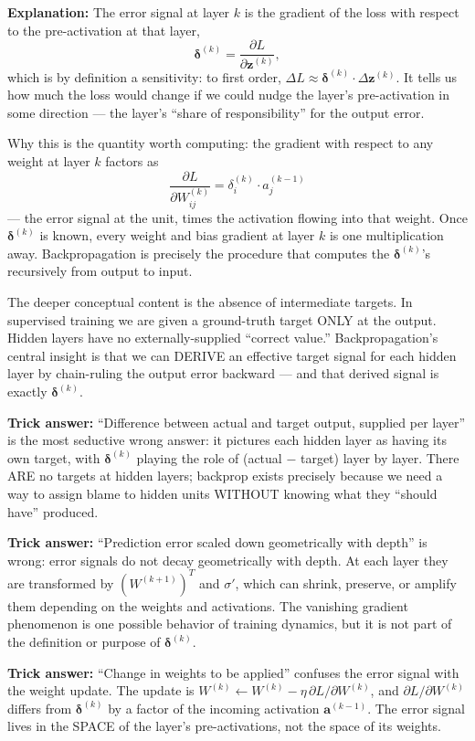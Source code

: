 \documentclass[12pt]{amsart}
\begin{document}
\textbf{Explanation:}
The error signal at layer $k$ is the gradient of the loss with respect to the
pre-activation at that layer,
$$\boldsymbol{\delta}^{(k)} = \frac{\partial L}{\partial \mathbf{z}^{(k)}},$$
which is by definition a sensitivity: to first order,
$\Delta L \approx \boldsymbol{\delta}^{(k)} \cdot \Delta \mathbf{z}^{(k)}$.
It tells us how much the loss would change if we could nudge the layer's
pre-activation in some direction --- the layer's ``share of responsibility''
for the output error.

Why this is the quantity worth computing: the gradient with respect to any
weight at layer $k$ factors as
$$\frac{\partial L}{\partial W_{ij}^{(k)}} = \delta_i^{(k)} \cdot a_j^{(k-1)}$$
--- the error signal at the unit, times the activation flowing into that
weight. Once $\boldsymbol{\delta}^{(k)}$ is known, every weight and bias
gradient at layer $k$ is one multiplication away. Backpropagation is precisely
the procedure that computes the $\boldsymbol{\delta}^{(k)}$'s recursively from
output to input.

The deeper conceptual content is the absence of intermediate targets.
In supervised training we are given a ground-truth target ONLY at the output.
Hidden layers have no externally-supplied ``correct value.'' Backpropagation's
central insight is that we can DERIVE an effective target signal for each
hidden layer by chain-ruling the output error backward --- and that derived
signal is exactly $\boldsymbol{\delta}^{(k)}$.

\textbf{Trick answer:}
``Difference between actual and target output, supplied per layer'' is the
most seductive wrong answer: it pictures each hidden layer as having its own
target, with $\boldsymbol{\delta}^{(k)}$ playing the role of (actual $-$ target)
layer by layer. There ARE no targets at hidden layers; backprop exists
precisely because we need a way to assign blame to hidden units WITHOUT
knowing what they ``should have'' produced.

\textbf{Trick answer:}
``Prediction error scaled down geometrically with depth'' is wrong: error
signals do not decay geometrically with depth. At each layer they are
transformed by $(W^{(k+1)})^T$ and $\sigma'$, which can shrink, preserve,
or amplify them depending on the weights and activations.
The vanishing gradient phenomenon is one possible behavior of training
dynamics, but it is not part of the definition or purpose of
$\boldsymbol{\delta}^{(k)}$.

\textbf{Trick answer:}
``Change in weights to be applied'' confuses the error signal with the weight
update. The update is
$W^{(k)} \leftarrow W^{(k)} - \eta \, \partial L / \partial W^{(k)}$,
and $\partial L / \partial W^{(k)}$ differs from $\boldsymbol{\delta}^{(k)}$
by a factor of the incoming activation $\mathbf{a}^{(k-1)}$. The error signal
lives in the SPACE of the layer's pre-activations, not the space of its weights.
\end{document}
